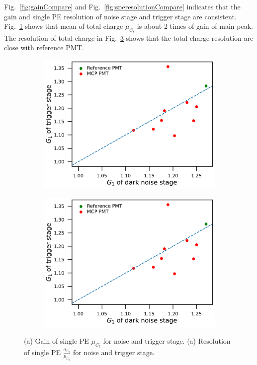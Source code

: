 Fig.~\ref{fig:gainCompare} and Fig.~\ref{fig:speresolutionCompare} indicates that the gain and single PE resolution of noise stage and trigger stage are consistent. Fig.~\ref{fig:totalchargeCompare} shows that mean of total charge $\mu_{C_t}$ is about 2 times of gain of main peak. The resolution of total charge in Fig.~\ref{fig:totalresolutionCompare} shows that the total charge resolution are close with reference PMT.

\begin{figure}
    \centering
    \begin{subfigure}[t]{0.49\textwidth}
        \includegraphics[width=\textwidth,page=3]{figures/result/compare.pdf}
        \caption{}
        \label{fig:totalchargeCompare}
    \end{subfigure}
    \begin{subfigure}[t]{0.49\textwidth}
        \includegraphics[width=\textwidth,page=4]{figures/result/compare.pdf}
        \caption{}
        \label{fig:totalresolutionCompare}
    \end{subfigure}
    \caption{(a) Gain of single PE $\mu_{C_t}$ for noise and trigger stage. (a) Resolution of single PE $\frac{\sigma_{C_t}}{\mu_{C_t}}$ for noise and trigger stage.}
\end{figure}


